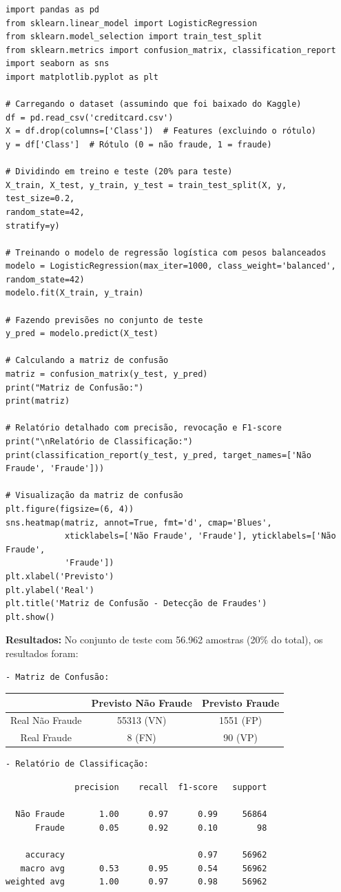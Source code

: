 \documentclass[a4paper,12pt,openany]{book}
\begin{document}
\begin{verbatim}
import pandas as pd
from sklearn.linear_model import LogisticRegression
from sklearn.model_selection import train_test_split
from sklearn.metrics import confusion_matrix, classification_report
import seaborn as sns
import matplotlib.pyplot as plt

# Carregando o dataset (assumindo que foi baixado do Kaggle)
df = pd.read_csv('creditcard.csv')
X = df.drop(columns=['Class'])  # Features (excluindo o rótulo)
y = df['Class']  # Rótulo (0 = não fraude, 1 = fraude)

# Dividindo em treino e teste (20% para teste)
X_train, X_test, y_train, y_test = train_test_split(X, y, test_size=0.2, 
random_state=42, 
stratify=y)

# Treinando o modelo de regressão logística com pesos balanceados
modelo = LogisticRegression(max_iter=1000, class_weight='balanced', 
random_state=42)
modelo.fit(X_train, y_train)

# Fazendo previsões no conjunto de teste
y_pred = modelo.predict(X_test)

# Calculando a matriz de confusão
matriz = confusion_matrix(y_test, y_pred)
print("Matriz de Confusão:")
print(matriz)

# Relatório detalhado com precisão, revocação e F1-score
print("\nRelatório de Classificação:")
print(classification_report(y_test, y_pred, target_names=['Não Fraude', 'Fraude']))

# Visualização da matriz de confusão
plt.figure(figsize=(6, 4))
sns.heatmap(matriz, annot=True, fmt='d', cmap='Blues', 
            xticklabels=['Não Fraude', 'Fraude'], yticklabels=['Não Fraude', 
            'Fraude'])
plt.xlabel('Previsto')
plt.ylabel('Real')
plt.title('Matriz de Confusão - Detecção de Fraudes')
plt.show()
\end{verbatim}

\textbf{Resultados:} No conjunto de teste com 56.962 amostras (20\% do total), os resultados foram:
\begin{verbatim}
- Matriz de Confusão:
\end{verbatim}
  \begin{tabular}{|c|c|c|}
    \hline
     & Previsto Não Fraude & Previsto Fraude \\
    \hline
    Real Não Fraude & 55313 (VN) & 1551 (FP) \\
    Real Fraude & 8 (FN) & 90 (VP) \\
    \hline
  \end{tabular}
  \begin{verbatim}
- Relatório de Classificação: 
  \end{verbatim}
  \begin{verbatim}
              precision    recall  f1-score   support

  Não Fraude       1.00      0.97      0.99     56864
      Fraude       0.05      0.92      0.10        98

    accuracy                           0.97     56962
   macro avg       0.53      0.95      0.54     56962
weighted avg       1.00      0.97      0.98     56962
  \end{verbatim}
\end{document}
